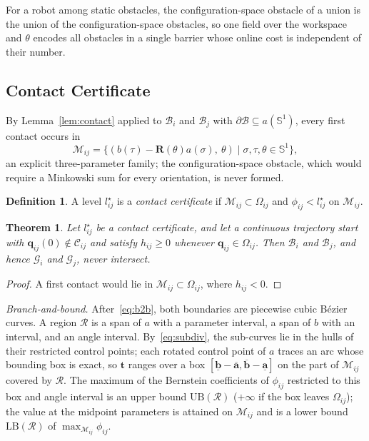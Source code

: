 \documentclass[journal]{IEEEtran}
\newtheorem{theorem}{Theorem}
\theoremstyle{definition}
\newtheorem{definition}{Definition}
\newcommand{\Sone}{\mathbb{S}^1}
\newcommand{\CO}{\mathcal{C}}
\newcommand{\Mset}{\mathcal{M}}
\newcommand{\Rot}{\mathbf{R}}
\begin{document}
For a robot among static obstacles, the configuration-space obstacle of a union is the union of the
configuration-space obstacles, so one field over the workspace and $\theta$ encodes all obstacles in
a single barrier whose online cost is independent of their number.

\subsection{Contact Certificate}\label{sec:tab-cert}
By Lemma~\ref{lem:contact} applied to $\mathcal B_i$ and $\mathcal B_j$ with
$\partial\mathcal B\subseteq a(\Sone)$, every first contact occurs in
\begin{equation}\label{eq:M}
\Mset_{ij}=\{(b(\tau)-\Rot(\theta)a(\sigma),\ \theta)\mid \sigma,\tau,\theta\in\Sone\},
\end{equation}
an explicit three-parameter family; the configuration-space obstacle, which would require a
Minkowski sum for every orientation, is never formed.
\begin{definition}\label{def:cert}
A level $l^\star_{ij}$ is a \emph{contact certificate} if $\Mset_{ij}\subset\Omega_{ij}$ and
$\phi_{ij}<l^\star_{ij}$ on $\Mset_{ij}$.
\end{definition}
\begin{theorem}\label{thm:safe}
Let $l^\star_{ij}$ be a contact certificate, and let a continuous trajectory start with
$\mathbf q_{ij}(0)\notin\CO_{ij}$ and satisfy $h_{ij}\ge0$ whenever $\mathbf q_{ij}\in\Omega_{ij}$.
Then $\mathcal B_i$ and $\mathcal B_j$, and hence $\mathcal G_i$ and $\mathcal G_j$, never intersect.
\end{theorem}
\begin{proof}
A first contact would lie in $\Mset_{ij}\subset\Omega_{ij}$, where $h_{ij}<0$.
\end{proof}

\emph{Branch-and-bound.} After~\eqref{eq:b2b}, both boundaries are piecewise cubic B\'ezier curves. A
region $\mathcal R$ is a span of $a$ with a parameter interval, a span of $b$ with an interval, and an
angle interval. By~\eqref{eq:subdiv}, the sub-curves lie in the hulls of their restricted control
points; each rotated control point of $a$ traces an arc whose bounding box is exact, so $\mathbf t$
ranges over a box $[\underline{\mathbf b}-\overline{\mathbf a},\overline{\mathbf b}-\underline{\mathbf
a}]$ on the part of $\Mset_{ij}$ covered by $\mathcal R$. The maximum of the Bernstein coefficients of
$\phi_{ij}$ restricted to this box and angle interval is an upper bound $\mathrm{UB}(\mathcal R)$
($+\infty$ if the box leaves $\Omega_{ij}$); the value at the midpoint parameters is attained on
$\Mset_{ij}$ and is a lower bound $\mathrm{LB}(\mathcal R)$ of $\max_{\Mset_{ij}}\phi_{ij}$.
\end{document}

